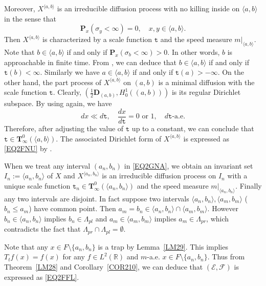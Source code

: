 \documentclass[a4paper]{amsart}
\theoremstyle{definition}
\theoremstyle{remark}
\numberwithin{equation}{section}
\begin{document}
Moreover, $X^{\langle a,b\rangle}$ is an irreducible diffusion process with no killing inside on $\langle a,b\rangle$ in the sense that
\[
	\mathbf{P}_x(\sigma_y<\infty)=0, \quad x,y\in \langle a,b \rangle.
\]
Then $X^{\langle a,b\rangle}$ is characterized by a scale function ${{\mathtt{t}}}$ and the speed measure $m|_{\langle a, b\rangle}$. Note that $b\in \langle a,b\rangle $ if and only if $\mathbf{P}_x(\sigma_b<\infty)>0$. In other words, $b$ is approachable in finite time. From \cite[(3.5.13)]{CF12}, we can deduce that $b\in \langle a, b\rangle$ if and only if ${{\mathtt{t}}}(b)<\infty$. Similarly we have $a\in \langle a,b \rangle$ if and only if ${{\mathtt{t}}}(a)>-\infty$. On the other hand, the part process of $X^{\langle a,b\rangle}$ on $(a,b)$ is a minimal diffusion with the scale function ${{\mathtt{t}}}$. Clearly, $(\frac{1}{2}\mathbf{D}_{(a,b)}, H^1_0((a,b)))$ is its regular Dirichlet subspace. By using \cite[Theorem~4.1]{FHY10} again, we have
\[
	dx\ll d{{\mathtt{t}}}, \quad \frac{dx}{d{{\mathtt{t}}}}=0 \text{ or }1,\quad d{{\mathtt{t}}}\text{-a.e.}
\]
Therefore, after adjusting the value of ${{\mathtt{t}}}$ up to a constant, we can conclude that ${{\mathtt{t}}}\in {{\mathbf{T}}}^0_\infty(\langle a, b\rangle)$. The associated Dirichlet form of $X^{\langle a,b\rangle}$ is expressed as \eqref{EQ2FNU} by \cite[Theorem~3.1]{FHY10}.

When we treat any interval $(a_n, b_n)$ in \eqref{EQ2GNA}, we obtain an invariant set $I_n:=\langle a_n, b_n\rangle$ of $X$ and $X^{\langle a_n,b_n\rangle}$ is an irreducible diffusion process on $I_n$ with a unique scale function ${{\mathtt{t}}}_n\in {{\mathbf{T}}}^0_\infty(\langle a_n, b_n\rangle)$ and the speed measure $m|_{\langle a_n,b_n \rangle}$. Finally any two intervals are disjoint. In fact suppose two intervals $\langle a_n, b_n\rangle, \langle a_m, b_m\rangle$ ($b_n\leq a_m$) have common point.  Then $a_m=b_n\in \langle a_n, b_n\rangle\cap  \langle a_m, b_m\rangle$. However $b_n\in \langle a_n, b_n\rangle$ implies $b_n\in \Lambda_{pl}$ and $a_m\in \langle a_m, b_m\rangle$ implies $a_m\in \Lambda_{pr}$, which contradicts the fact that $\Lambda_{pr}\cap \Lambda_{pl}=\emptyset$.

Note that any $x\in F\setminus \{a_n,b_n\}$ is a trap by Lemma~\ref{LM29}.  This implies $T_tf(x)=f(x)$ for any $f\in L^2(\mathbb{R})$ and $m$-a.e. $x\in F\setminus \{a_n,b_n\}$. Thus from Theorem~\ref{LM28} and Corollary~\ref{COR210}, we can deduce that $({{\mathcal{E}}},{{\mathcal{F}}})$ is expressed as \eqref{EQ2FFL}.
\end{document}
